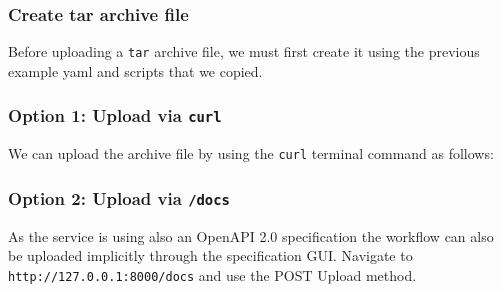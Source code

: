 \subsubsection{Create tar archive file}\label{create-tar-archive-file}

Before uploading a \texttt{tar} archive file, we must first create it
using the previous example yaml and scripts that we copied.

\begin{Shaded}
\begin{Highlighting}[]
 
\end{Highlighting}
\end{Shaded}

\subsubsection{\texorpdfstring{Option 1: Upload via
\texttt{curl}}{Option 1: Upload via curl}}\label{option-1-upload-via-curl}

We can upload the archive file by using the \texttt{curl} terminal
command as follows:

\begin{Shaded}
\begin{Highlighting}[]
   \DataTypeTok{\textbackslash{}}
   \DataTypeTok{\textbackslash{}}
    \DataTypeTok{\textbackslash{}}
   \StringTok{\textquotesingle{}\textquotesingle{}}
\end{Highlighting}
\end{Shaded}

\subsubsection{\texorpdfstring{Option 2: Upload via
\texttt{/docs}}{Option 2: Upload via /docs}}\label{option-2-upload-via-docs}

As the service is using also an OpenAPI 2.0 specification the workflow
can also be uploaded implicitly through the specification GUI. Navigate
to \texttt{http://127.0.0.1:8000/docs} and use the POST Upload method.


